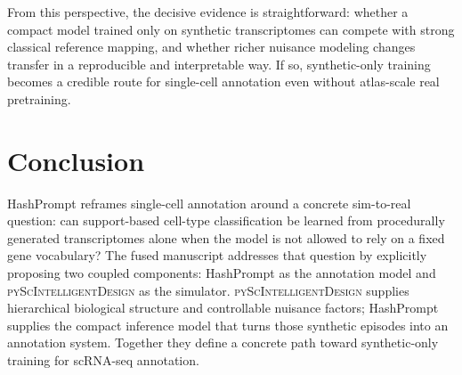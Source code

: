 \documentclass{article}
\begin{document}
From this perspective, the decisive evidence is straightforward: whether a compact model trained only on synthetic transcriptomes can compete with strong classical reference mapping, and whether richer nuisance modeling changes transfer in a reproducible and interpretable way. If so, synthetic-only training becomes a credible route for single-cell annotation even without atlas-scale real pretraining.

\section{Conclusion}

HashPrompt reframes single-cell annotation around a concrete sim-to-real question: can support-based cell-type classification be learned from procedurally generated transcriptomes alone when the model is not allowed to rely on a fixed gene vocabulary? The fused manuscript addresses that question by explicitly proposing two coupled components: HashPrompt as the annotation model and \textsc{pyScIntelligentDesign} as the simulator. \textsc{pyScIntelligentDesign} supplies hierarchical biological structure and controllable nuisance factors; HashPrompt supplies the compact inference model that turns those synthetic episodes into an annotation system. Together they define a concrete path toward synthetic-only training for scRNA-seq annotation.



\end{document}
